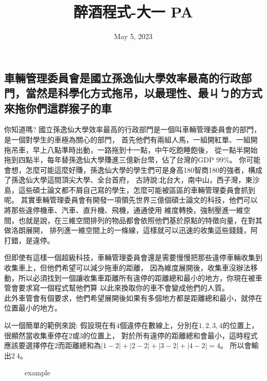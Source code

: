 \documentclass{article}
\title{醉酒程式-大一 PA}
\date{May 5, 2023}
\begin{document}
\begin{CJK*}{UTF8}{bsmi}

\maketitle

\section*{車輛管理委員會是國立孫逸仙大學效率最高的行政部門，當然是科學化方式拖吊，以最理性、最ㄐㄅ的方式來拖你們這群猴子的車}

你知道嗎? 國立孫逸仙大學效率最高的行政部門是一個叫車輛管理委員會的部門，是一個對學生的車極為關心的部門，
首先他們有兩組人馬，一組開紅單、一組開拖吊車，早上八點準時出動，一路拖到十一點，中午吃飽睡飽後，
從一點半開始拖到四點半，每年替孫逸仙大學賺進三億新台幣，佔了台灣的GDP 99\%。
你可能會想，怎麼可能這麼好賺，孫逸仙大學的學生們可是身高180智商180的強者，構成了孫逸仙大學這間頂尖大學、全台首府，
古詩說:北台大，南中山，西子灣，東沙島，這些碩士論文都不屑自己寫的學生，怎麼可能被區區的車輛管理委員會抓到呢。
其實車輛管理委員會有開發一項領先世界三億個碩士論文的科技，他們可以將那些違停機車、汽車、直升機、飛機，通通使用
維度轉換，強制壓進一維空間，也就是說，在三維空間排列的物品都會依照他們基於原點的特徵向量，在對其做洛朗展開，
排列進一維空間上的一條線，這樣就可以迅速的收集這些錢錢，阿打錯，是違停。

但即使有這樣一個超級科技，車輛管理委員會還是需要慢慢把那些違停車輛收集到收集車上，但他們希望可以減少拖車的距離，
因為維度展開後，收集車沒辦法移動，所以必須找到一個讓收集車距離所有違停的距離總和最小的地方，你現在被車管會要求寫一個程式幫他們算
以此來換取你的車不會變成他們的人質。\\
此外車管會有個要求，他們希望展開後如果有多個地方都是距離總和最小，就停在位置最小的地方。

以一個簡單的範例來說: 假設現在有$4$個違停在數線上，分別在$1,2,3,4$的位置上，很顯然當收集車停在$2$或$3$的位置上，
對於所有違停的距離總和會最小，這時程式應該要選擇停在$2$而距離總和為$\lvert1-2\rvert+\lvert2-2\rvert+\lvert3-2\rvert+\lvert4-2\rvert=4$。
所以會輸出$2\ 4$。

\begin{figure}[htb]
    \vspace{-\baselineskip}  
    \begin{center}
      \caption{example}
      \label{fig:example}
    \end{center}
    \vspace{-\baselineskip}
\end{figure}


\end{CJK*}
\end{document}
